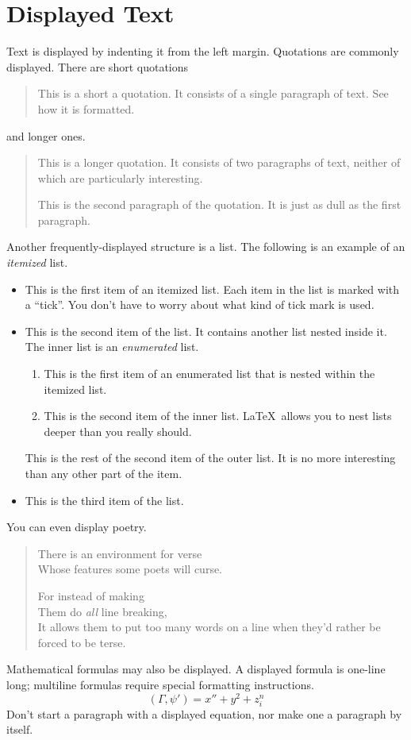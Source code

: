 \documentclass{article}      %
\newcommand{\ip}[2]{(#1, #2)}
\begin{document}
\section{Displayed Text}

Text is displayed by indenting it from the left
margin.  Quotations are commonly displayed.  There
are short quotations
\begin{quote}
   This is a short a quotation.  It consists of a
   single paragraph of text.  See how it is formatted.
\end{quote}
and longer ones.
\begin{quotation}
   This is a longer quotation.  It consists of two
   paragraphs of text, neither of which are
   particularly interesting.

   This is the second paragraph of the quotation.  It
   is just as dull as the first paragraph.
\end{quotation}
Another frequently-displayed structure is a list.
The following is an example of an \emph{itemized}
list.
\begin{itemize}
   \item This is the first item of an itemized list.
         Each item in the list is marked with a ``tick''.
         You don't have to worry about what kind of tick
         mark is used.

   \item This is the second item of the list.  It
         contains another list nested inside it.  The inner
         list is an \emph{enumerated} list.
         \begin{enumerate}
            \item This is the first item of an enumerated
                  list that is nested within the itemized list.

            \item This is the second item of the inner list.
                  \LaTeX\ allows you to nest lists deeper than
                  you really should.
         \end{enumerate}
         This is the rest of the second item of the outer
         list.  It is no more interesting than any other
         part of the item.
   \item This is the third item of the list.
\end{itemize}
You can even display poetry.
\begin{verse}
   There is an environment
    for verse \\             %
   Whose features some poets %
   will curse.


   For instead of making\\
   Them do \emph{all} line breaking, \\
   It allows them to put too many words on a line when they'd rather be
   forced to be terse.
\end{verse}

Mathematical formulas may also be displayed.  A
displayed formula
is
one-line long; multiline
formulas require special formatting instructions.
   \[  \ip{\Gamma}{\psi'} = x'' + y^{2} + z_{i}^{n}\]
Don't start a paragraph with a displayed equation,
nor make one a paragraph by itself.
\end{document}
